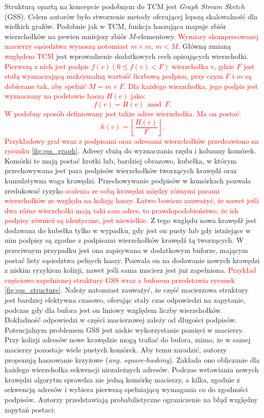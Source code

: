     Strukturą opartą na koncepcie podobnym do TCM jest \emph{Graph Stream Sketch} (GSS)\cite{Gou_Zou_Zhao_Yang_2019}. Celem autorów było stworzenie metody oferującej lepszą skalowalność dla wielkich grafów. Podobnie jak w TCM, funkcja haszująca mapuje zbiór wierzchołków na pewien mniejszy zbiór $M$-elementowy. \textcolor{red}{Wymiary skompresowanej macierzy sąsiedztwa wynoszą notomiast $m \times m$, $m < M$}. Główną zmianą \textcolor{red}{względem TCM} jest wprowadzenie dodatkowych cech opisujących wierzchołki. \textcolor{red}{Pierwszą z nich jest podpis $f(v) (0 \leq f(v) < F)$ wierzchołka $v$, gdzie $F$ jest stałą wyznaczającą maksymalną wartość liczbową podpisu, przy czym $F$ i $m$ są dobierane tak, aby spełnić $M = m \times F$. Dla każdego wierzchołka, jego podpis jest wyznaczany na podstawie hasza $H(v)$ jako:
    \[
        f(v) = H(v) \bmod F. 
    \] 
    W podobny sposób definiowany jest także adres wierzchołka. Ma on postać:
    \[
        h(v) = \left\lfloor \frac{H(v)}{F} \right\rfloor.
    \]} 
    \textcolor{red}{Przykładowy graf wraz z podpisami oraz adresami wierzchołków przedsawiono na rysunku \ref{fig:gss_graph}}. Adresy służą do wyznaczania rzędu i kolumny komórek. Komórki te mają postać krotki lub, bardziej obrazowo, kubełka, w którym przechowywana jest para podpisów wierzchołków tworzących krawędź oraz kumulatywna waga krawędzi. Przechowywanie podpisów w komórkach pozwala zredukować ryzyko \textcolor{red}{scalenia ze sobą krawędzi między różnymi parami wierzchołków ze względu na kolizję haszy. Łatwo bowiem zauważyć, że nawet jeśli dwa różne wierzchołki mają taki sam adres, to prawdopodobieństwo, że ich podpisy również są identyczne, jest niewielkie.} Z tego względu nowa krawędź jest dodawana do kubełka tylko w wypadku, gdy jest on pusty lub gdy istniejące w nim podpisy są zgodne z podpisami wierzchołków krawędź tą tworzących. W przeciwnym przypadku jest ona zapisywana w dodatkowym buforze, mającym postać listy sąsiedztwa pełnych haszy. Pozwala on na dodawanie nowych krawędzi z niskim ryzykiem kolizji, nawet jeśli sama macierz jest już zapełniona. \textcolor{red}{Przykład częściowo zapełnionej struktury GSS wraz z buforem przedstawia rysunek \ref{fig:gss_structure}.} Należy natomiast zauważyć, że część macierzowa struktury jest bardziej efektywna czasowo, oferując stały czas odpowiedzi na zapytanie, podczas gdy dla bufora jest on liniowy względem liczby wierzchołków. Dokładność odpowiedzi w części macierzowej zależy od długości podpisów. Potencjalnym problemem GSS jest niskie wykorzystanie pamięci w macierzy. Przy kolizji adresów nowe krawędzie mogą trafiać do bufora, mimo, że w samej macierzy pozostaje wiele pustych komórek. Aby temu zaradzić, autorzy proponują haszowanie krzyżowe (\emph{ang. square-hashing}). Zakłada ono obliczanie dla każdego wierzchołka sekwencji niezależnych adresów. Podczas wstawiania nowych krawędzi algorytm sprawdza nie jedną komórkę macierzy, a kilka, zgodnie z sekwencją adresów i wybiera pierwszą spełniającą wymagania co do zgodności podpisów. Autorzy przedstawiają probabilistyczne ograniczenie na błąd względny zapytań postaci: 
